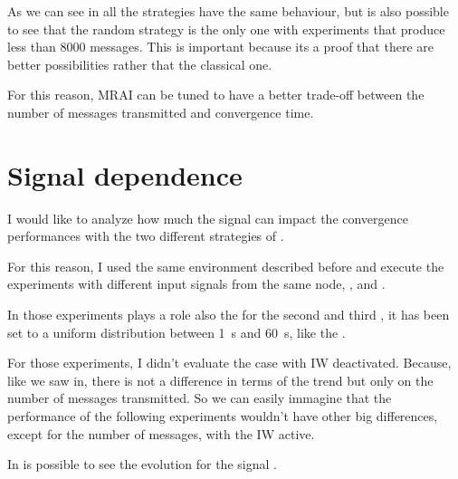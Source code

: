 As we can see in  all the strategies have the same
behaviour, but is also possible to see that the random strategy is the only
one with experiments that produce less than \num{8000} messages.
This is important because its a proof that there are better possibilities rather
that the classical one.

For this reason, \ac{MRAI} can be tuned to have a better trade-off between 
the number of messages transmitted and convergence time.

\section{Signal dependence}
\label{sec:bgp_mrai_signal_dependance}

I would like to analyze how much the signal can impact the convergence performances
with the two different strategies of .

For this reason, I used the same environment described before and execute the
experiments with different input signals from the same node, , 
and .

In those experiments plays a role also the 
for the second and third , it has been set to a uniform distribution
between \SI{1}{\second} and \SI{60}{\second}, like the .

For those experiments, I didn't evaluate the case with \ac{IW} deactivated.
Because, like we saw in,
there is not a difference in terms of the trend but only on the number of messages
transmitted.
So we can easily immagine that the performance of the following experiments 
wouldn't have other big differences, except for the number of messages, with the
\ac{IW} active.


In  is possible to see the evolution
for the signal .

